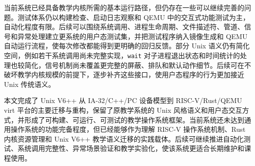 当前系统已经具备教学内核所需的基本运行路径，但仍存在一些可以继续完善的问题。测试体系仍以构建检查、启动日志观察和 QEMU 中的交互式功能测试为主，自动化程度有限。后续可以围绕系统调用、进程生命周期、文件描述符、管道、信号和异常处理建立更系统的用户态测试集，并把测试程序纳入镜像生成和 QEMU 自动运行流程，使每次修改都能得到更明确的回归反馈。部分 Unix 语义仍有简化空间，例如若干系统调用尚未完整实现，\verb|wait| 对子进程退出状态和时间统计的处理也较简化，信号机制尚未覆盖更完整的屏蔽、排队和默认动作细节。后续可在不破坏教学内核规模的前提下，逐步补齐这些接口，使用户态程序的行为更加接近 Unix 传统语义。

本文完成了 Unix V6++ 从 IA-32/C++/PC 设备模型到 RISC-V/Rust/QEMU virt 平台的主要迁移与重构，保留了原教学系统的 Unix 风格语义和用户态交互方式，并形成了可构建、可运行、可测试的教学操作系统框架。当前系统还未达到通用操作系统的功能完备程度，但已经能够作为理解 RISC-V 操作系统机制、Rust 内核资源管理和 Unix V6++ 教学语义迁移的实践载体。后续可继续推进自动化测试、系统调用完整性、异常场景验证和教学实验化，使该系统更适合长期维护和课程使用。
